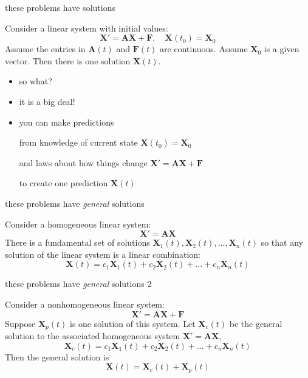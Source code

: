 \documentclass[dvipsnames,colorlinks]{beamer}
\newcommand{\bA}{\mathbf{A}}
\newcommand{\bF}{\mathbf{F}}
\newcommand{\bX}{\mathbf{X}}
\begin{document}
\begin{frame}{these problems have solutions}

\begin{theorem}  Consider a linear system with initial values:
    $$\bX' = \bA \bX + \bF, \quad \bX(t_0)=\bX_0$$
Assume the entries in $\bA(t)$ and $\bF(t)$ are continuous.  Assume $\bX_0$ is a given vector.  Then there is one solution $\bX(t)$.
\end{theorem}

\bigskip
\begin{itemize}
\item so what?
\item it is a big deal!
\item \alert{you can make predictions}

from knowledge of current state \hfill $\bX(t_0)=\bX_0$

and laws about how things change \hfill $\bX' = \bA \bX + \bF$

to create one prediction \hfill $\bX(t)$
\end{itemize}
\end{frame}


\begin{frame}{these problems have \emph{general} solutions}

\begin{theorem}  Consider a \alert{homogeneous} linear system:
    $$\bX' = \bA \bX$$
There is a \alert{fundamental set} of solutions $\bX_1(t), \bX_2(t), \dots, \bX_n(t)$ so that any solution of the linear system is a linear combination:
    $$\bX(t) = c_1 \bX_1(t) + c_2 \bX_2(t) + \dots + c_n \bX_n(t)$$
\end{theorem}
\end{frame}


\begin{frame}{these problems have \emph{general} solutions 2}

\begin{theorem}  Consider a \alert{non}homogeneous linear system:
    $$\bX' = \bA \bX + \bF$$
Suppose $\bX_p(t)$ is one solution of this system.  Let $\bX_c(t)$ be the general solution to the associated homogeneous system $\bX' = \bA \bX$,
    $$\bX_c(t) = c_1 \bX_1(t) + c_2 \bX_2(t) + \dots + c_n \bX_n(t)$$
Then the general solution is
    $$\bX(t) = \bX_c(t) + \bX_p(t)$$
\end{theorem}
\end{frame}
\end{document}
